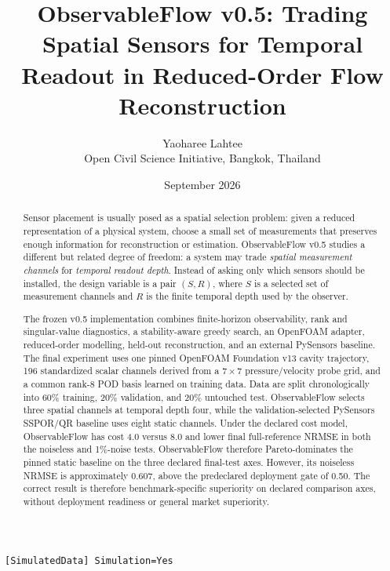 \documentclass[11pt]{article}
\title{\textbf{ObservableFlow v0.5: Trading Spatial Sensors for Temporal Readout in Reduced-Order Flow Reconstruction}}
\author{Yaoharee Lahtee\\Open Civil Science Initiative, Bangkok, Thailand}
\date{September 2026}
\begin{document}
\maketitle

\begin{center}
\texttt{[SimulatedData] Simulation=Yes}
\end{center}

\begin{abstract}
Sensor placement is usually posed as a spatial selection problem: given a reduced representation of a physical system, choose a small set of measurements that preserves enough information for reconstruction or estimation. ObservableFlow v0.5 studies a different but related degree of freedom: a system may trade \emph{spatial measurement channels} for \emph{temporal readout depth}. Instead of asking only which sensors should be installed, the design variable is a pair $(S,R)$, where $S$ is a selected set of measurement channels and $R$ is the finite temporal depth used by the observer.

The frozen v0.5 implementation combines finite-horizon observability, rank and singular-value diagnostics, a stability-aware greedy search, an OpenFOAM adapter, reduced-order modelling, held-out reconstruction, and an external PySensors baseline. The final experiment uses one pinned OpenFOAM Foundation v13 cavity trajectory, 196 standardized scalar channels derived from a $7\times7$ pressure/velocity probe grid, and a common rank-8 POD basis learned on training data. Data are split chronologically into 60\% training, 20\% validation, and 20\% untouched test. ObservableFlow selects three spatial channels at temporal depth four, while the validation-selected PySensors SSPOR/QR baseline uses eight static channels. Under the declared cost model, ObservableFlow has cost 4.0 versus 8.0 and lower final full-reference NRMSE in both the noiseless and 1\%-noise tests. ObservableFlow therefore Pareto-dominates the pinned static baseline on the three declared final-test axes. However, its noiseless NRMSE is approximately 0.607, above the predeclared deployment gate of 0.50. The correct result is therefore benchmark-specific superiority on declared comparison axes, without deployment readiness or general market superiority.
\end{abstract}
\end{document}

